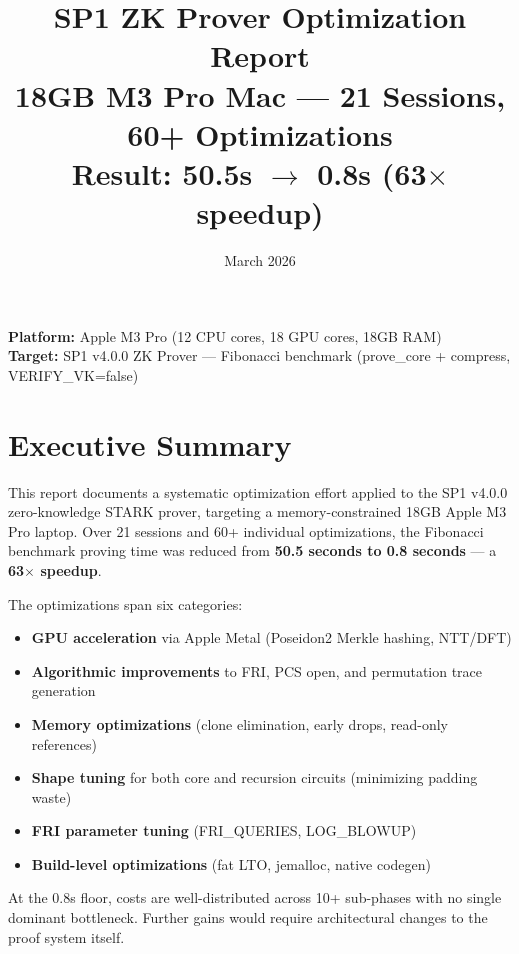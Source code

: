\documentclass[11pt,a4paper]{article}
\title{%
    \vspace{-1cm}
    \textbf{SP1 ZK Prover Optimization Report} \\[0.5em]
    \large 18GB M3 Pro Mac --- 21 Sessions, 60+ Optimizations \\[0.3em]
    \large \textbf{Result: 50.5s $\rightarrow$ 0.8s (63$\times$ speedup)}
}
\author{}
\date{March 2026}
\begin{document}
\maketitle
\thispagestyle{fancy}

\vspace{-1cm}
\noindent\textbf{Platform:} Apple M3 Pro (12 CPU cores, 18 GPU cores, 18GB RAM) \\
\textbf{Target:} SP1 v4.0.0 ZK Prover --- Fibonacci benchmark (prove\_core + compress, VERIFY\_VK=false)

\tableofcontents
\newpage

\section{Executive Summary}

This report documents a systematic optimization effort applied to the SP1 v4.0.0 zero-knowledge STARK prover, targeting a memory-constrained 18GB Apple M3 Pro laptop. Over 21 sessions and 60+ individual optimizations, the Fibonacci benchmark proving time was reduced from \textbf{50.5 seconds to 0.8 seconds} --- a \textbf{63$\times$ speedup}.

The optimizations span six categories:

\begin{itemize}[nosep]
    \item \textbf{GPU acceleration} via Apple Metal (Poseidon2 Merkle hashing, NTT/DFT)
    \item \textbf{Algorithmic improvements} to FRI, PCS open, and permutation trace generation
    \item \textbf{Memory optimizations} (clone elimination, early drops, read-only references)
    \item \textbf{Shape tuning} for both core and recursion circuits (minimizing padding waste)
    \item \textbf{FRI parameter tuning} (FRI\_QUERIES, LOG\_BLOWUP)
    \item \textbf{Build-level optimizations} (fat LTO, jemalloc, native codegen)
\end{itemize}

At the 0.8s floor, costs are well-distributed across 10+ sub-phases with no single dominant bottleneck. Further gains would require architectural changes to the proof system itself.

\end{document}
